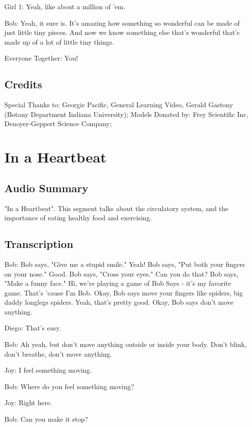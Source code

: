 Girl 1: Yeah, like about a million of 'em.

Bob: Yeah, it sure is. It's amazing how something so wonderful can be made of just little tiny pieces. And now we know something else that's wonderful that's made up of a lot of little tiny things.

Everyone Together: You!

\subsection{Credits}

Special Thanks to: Georgie Pacific, General Learning Video, Gerald Gastony (Botany Department Indiana University);
Models Donated by: Frey Scientific Inc, Denoyer-Geppert Science Company;

\section{In a Heartbeat}

\subsection{Audio Summary}

"In a Heartbeat". This segment talks about the circulatory system, and the importance of eating healthy food and exercising.

\subsection{Transcription}

Bob: Bob says, "Give me a stupid smile." Yeah! Bob says, "Put both your fingers on your nose." Good. Bob says, "Cross your eyes." Can you do that? Bob says, "Make a funny face." Hi, we're playing a game of Bob Says - it's my favorite game. That's 'cause I'm Bob. Okay, Bob says move your fingers like spiders, big daddy longlegs spiders. Yeah, that's pretty good. Okay, Bob says don't move anything.

Diego: That's easy.

Bob: Ah yeah, but don't move anything outside or inside your body. Don't blink, don't breathe, don't move anything.

Joy: I feel something moving.

Bob: Where do you feel something moving?

Joy: Right here.

Bob: Can you make it stop?

